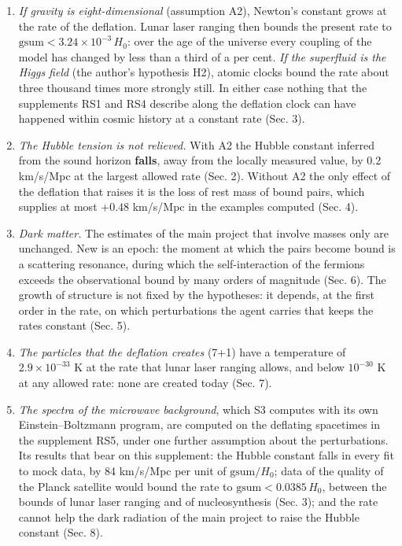 \documentclass[
  10pt,
]{article}
\providecommand{\tightlist}{%
  \setlength{\itemsep}{0pt}\setlength{\parskip}{0pt}}
\begin{document}
\begin{enumerate}
\def\labelenumi{\arabic{enumi}.}
\tightlist
\item
  \emph{If gravity is eight-dimensional} (assumption A2), Newton's
  constant grows at the rate of the deflation. Lunar laser ranging then
  bounds the present rate to \(\mathrm{gsum}<3.24\times10^{-3}\,H_0\):
  over the age of the universe every coupling of the model has changed
  by less than a third of a per cent. \emph{If the superfluid is the
  Higgs field} (the author's hypothesis H2), atomic clocks bound the
  rate about three thousand times more strongly still. In either case
  nothing that the supplements RS1 and RS4 describe along the deflation
  clock can have happened within cosmic history at a constant rate (Sec.
  3).
\item
  \emph{The Hubble tension is not relieved.} With A2 the Hubble constant
  inferred from the sound horizon \textbf{falls}, away from the locally
  measured value, by 0.2 km/s/Mpc at the largest allowed rate (Sec. 2).
  Without A2 the only effect of the deflation that raises it is the loss
  of rest mass of bound pairs, which supplies at most \(+0.48\) km/s/Mpc
  in the examples computed (Sec. 4).
\item
  \emph{Dark matter.} The estimates of the main project that involve
  masses only are unchanged. New is an epoch: the moment at which the
  pairs become bound is a scattering resonance, during which the
  self-interaction of the fermions exceeds the observational bound by
  many orders of magnitude (Sec. 6). The growth of structure is not
  fixed by the hypotheses: it depends, at the first order in the rate,
  on which perturbations the agent carries that keeps the rates constant
  (Sec. 5).
\item
  \emph{The particles that the deflation creates} (7+1) have a
  temperature of \(2.9\times10^{-33}\) K at the rate that lunar laser
  ranging allows, and below \(10^{-30}\) K at any allowed rate: none are
  created today (Sec. 7).
\item
  \emph{The spectra of the microwave background}, which S3 computes with
  its own Einstein--Boltzmann program, are computed on the deflating
  spacetimes in the supplement RS5, under one further assumption about
  the perturbations. Its results that bear on this supplement: the
  Hubble constant falls in every fit to mock data, by 84 km/s/Mpc per
  unit of \(\mathrm{gsum}/H_0\); data of the quality of the Planck
  satellite would bound the rate to \(\mathrm{gsum}<0.0385\,H_0\),
  between the bounds of lunar laser ranging and of nucleosynthesis (Sec.
  3); and the rate cannot help the dark radiation of the main project to
  raise the Hubble constant (Sec. 8).
\end{enumerate}
\end{document}
